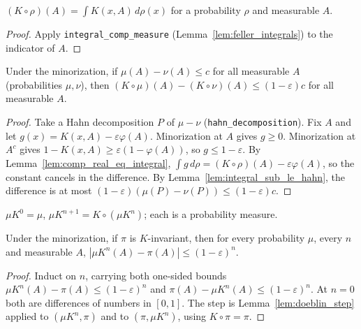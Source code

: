 \begin{lemma}
\label{lem:comp_real_eq_integral}
\leanok
$(K\circ\rho)(A) = \int K(x,A)\,d\rho(x)$ for a probability $\rho$ and measurable $A$.
\end{lemma}
\begin{proof}
\leanok
Apply \texttt{integral\_comp\_measure} (Lemma~\ref{lem:feller_integrals}) to the indicator of $A$.
\end{proof}

\begin{lemma}
\label{lem:doeblin_step}
\leanok
Under the minorization, if $\mu(A) - \nu(A) \le c$ for all measurable $A$ (probabilities $\mu,\nu$), then
$(K\circ\mu)(A) - (K\circ\nu)(A) \le (1-\varepsilon)c$ for all measurable $A$.
\end{lemma}
\begin{proof}
\leanok
{}
Take a Hahn decomposition $P$ of $\mu - \nu$ (\texttt{hahn\_decomposition}). Fix $A$ and let
$g(x) = K(x,A) - \varepsilon\varphi(A)$. Minorization at $A$ gives $g\ge0$. Minorization at $A^c$ gives
$1 - K(x,A) \ge \varepsilon(1-\varphi(A))$, so $g \le 1 - \varepsilon$. By Lemma~\ref{lem:comp_real_eq_integral},
$\int g\,d\rho = (K\circ\rho)(A) - \varepsilon\varphi(A)$, so the constant cancels in the difference. By
Lemma~\ref{lem:integral_sub_le_hahn}, the difference is at most $(1-\varepsilon)(\mu(P)-\nu(P)) \le (1-\varepsilon)c$.
\end{proof}

\begin{definition}
\label{def:iterComp}
\leanok
$\mu K^0 = \mu$, $\mu K^{n+1} = K \circ (\mu K^n)$; each is a probability measure.
\end{definition}

\begin{theorem}
\label{thm:doeblin_convergence}
\leanok
{}
Under the minorization, if $\pi$ is $K$-invariant, then for every probability $\mu$, every $n$ and
measurable $A$, $|\mu K^n(A) - \pi(A)| \le (1-\varepsilon)^n$.
\end{theorem}
\begin{proof}
\leanok
{}
Induct on $n$, carrying both one-sided bounds $\mu K^n(A) - \pi(A) \le (1-\varepsilon)^n$ and
$\pi(A) - \mu K^n(A) \le (1-\varepsilon)^n$. At $n=0$ both are differences of numbers in $[0,1]$. The step
is Lemma~\ref{lem:doeblin_step} applied to $(\mu K^n, \pi)$ and to $(\pi, \mu K^n)$, using $K\circ\pi = \pi$.
\end{proof}

